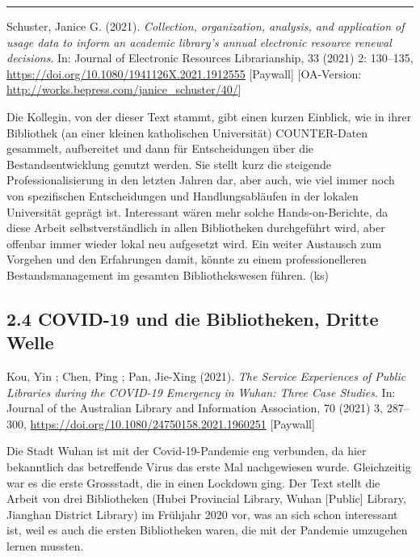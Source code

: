 \documentclass[a4paper,
fontsize=11pt,
oneside,
numbers=noperiodatend,
parskip=half-,
bibliography=totoc,
final
]{scrartcl}
\begin{document}
\begin{center}\rule{0.5\linewidth}{0.5pt}\end{center}

Schuster, Janice G. (2021). \emph{Collection, organization, analysis,
and application of usage data to inform an academic library's annual
electronic resource renewal decisions}. In: Journal of Electronic
Resources Librarianship, 33 (2021) 2: 130--135,
\url{https://doi.org/10.1080/1941126X.2021.1912555} {[}Paywall{]}
{[}OA-Version: \url{http://works.bepress.com/janice_schuster/40/}{]}

Die Kollegin, von der dieser Text stammt, gibt einen kurzen Einblick,
wie in ihrer Bibliothek (an einer kleinen katholischen Universität)
COUNTER-Daten gesammelt, aufbereitet und dann für Entscheidungen über
die Bestandsentwicklung genutzt werden. Sie stellt kurz die steigende
Professionalisierung in den letzten Jahren dar, aber auch, wie viel
immer noch von spezifischen Entscheidungen und Handlungsabläufen in der
lokalen Universität geprägt ist. Interessant wären mehr solche
Hands-on-Berichte, da diese Arbeit selbstverständlich in allen
Bibliotheken durchgeführt wird, aber offenbar immer wieder lokal neu
aufgesetzt wird. Ein weiter Austausch zum Vorgehen und den Erfahrungen
damit, könnte zu einem professionelleren Bestandsmanagement im gesamten
Bibliothekswesen führen. (ks)

\hypertarget{covid-19-und-die-bibliotheken-dritte-welle}{%
\subsection{2.4 COVID-19 und die Bibliotheken, Dritte
Welle}\label{covid-19-und-die-bibliotheken-dritte-welle}}

Kou, Yin ; Chen, Ping ; Pan, Jie-Xing (2021). \emph{The Service
Experiences of Public Libraries during the COVID-19 Emergency in Wuhan:
Three Case Studies}. In: Journal of the Australian Library and
Information Association, 70 (2021) 3, 287--300,
\url{https://doi.org/10.1080/24750158.2021.1960251} {[}Paywall{]}

Die Stadt Wuhan ist mit der Covid-19-Pandemie eng verbunden, da hier
bekanntlich das betreffende Virus das erste Mal nachgewiesen wurde.
Gleichzeitig war es die erste Grossstadt, die in einen Lockdown ging.
Der Text stellt die Arbeit von drei Bibliotheken (Hubei Provincial
Library, Wuhan {[}Public{]} Library, Jianghan District Library) im
Frühjahr 2020 vor, was an sich schon interessant ist, weil es auch die
ersten Bibliotheken waren, die mit der Pandemie umzugehen lernen
mussten.
\end{document}
